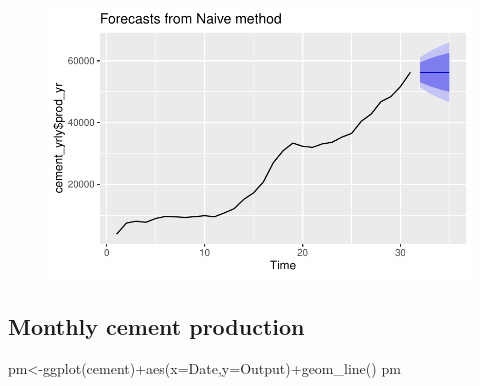 \documentclass[
  letterpaper,
  DIV=11,
  numbers=noendperiod]{scrartcl}
\newenvironment{Shaded}{\begin{snugshade}}{\end{snugshade}}
\newcommand{\AttributeTok}[1]{\textcolor[rgb]{0.40,0.45,0.13}{#1}}
\newcommand{\DecValTok}[1]{\textcolor[rgb]{0.68,0.00,0.00}{#1}}
\newcommand{\FunctionTok}[1]{\textcolor[rgb]{0.28,0.35,0.67}{#1}}
\newcommand{\NormalTok}[1]{\textcolor[rgb]{0.00,0.23,0.31}{#1}}
\newcommand{\OtherTok}[1]{\textcolor[rgb]{0.00,0.23,0.31}{#1}}
\newcommand{\SpecialCharTok}[1]{\textcolor[rgb]{0.37,0.37,0.37}{#1}}
\begin{document}
\begin{Shaded}
\end{Shaded}

\begin{figure}[H]

{\centering \includegraphics[width=17.1875in,height=\textheight]{cement_files/figure-pdf/unnamed-chunk-5-2.pdf}

}

\end{figure}

\hypertarget{monthly-cement-production}{%
\subsection{Monthly cement production}\label{monthly-cement-production}}

\begin{Shaded}
\begin{Highlighting}[]
\NormalTok{pm}\OtherTok{\textless{}{-}}\FunctionTok{ggplot}\NormalTok{(cement)}\SpecialCharTok{+}\FunctionTok{aes}\NormalTok{(}\AttributeTok{x=}\NormalTok{Date,}\AttributeTok{y=}\NormalTok{Output)}\SpecialCharTok{+}\FunctionTok{geom\_line}\NormalTok{()}
\NormalTok{pm}
\end{Highlighting}
\end{Shaded}
\end{document}
